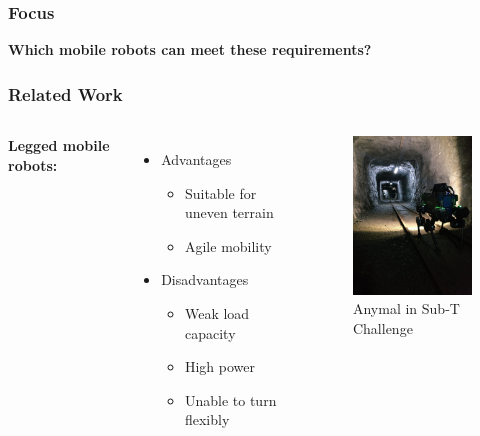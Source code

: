 \begin{frame} %
\frametitle{Focus}
\centering
\textbf{Which mobile robots can meet these requirements?}
\end{frame}

\begin{frame} %
\frametitle{Related Work}
\begin{columns}
\textbf{Legged mobile robots:}

\begin{itemize}
    \item Advantages
    \begin{itemize}
        \item Suitable for uneven terrain
        \item Agile mobility
    \end{itemize}
    \item Disadvantages
    \begin{itemize}
        \item Weak load capacity
        \item High power
        \item Unable to turn flexibly
    \end{itemize}
\end{itemize}

\begin{figure}
    \centering
    \vspace{-1.2cm}
    \includegraphics[width=4.5cm]{photos/qua-leg.png} 
    \vspace{-0.3cm}
    \caption{Anymal in Sub-T Challenge}
    \label{fig:sub-t}
    \vspace{-0.7cm}
\end{figure}
\end{columns}
\end{frame}

